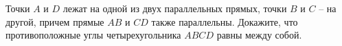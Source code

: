 \begin{ex}
	\begin{condition}
		Точки \( A  \) и \( D  \) лежат на одной из двух параллельных
		прямых, точки \( B  \) и \( C \) – на другой, причем прямые \( AB  \) и \( CD \) также параллельны. Докажите, что противоположные углы четырехугольника \( ABCD  \) равны между собой.
	\end{condition}
\end{ex}